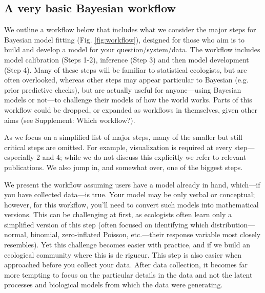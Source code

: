 \documentclass[11pt]{article}
\begin{document}
{\subsection*{A very basic Bayesian workflow}
We outline a workflow below that includes what we consider the major steps for Bayesian model fitting (Fig. \ref{fig:workflow}), designed for those who aim is to build and develop a model for
your question/system/data. The workflow includes model calibration (Steps 1-2), inference (Step 3) and then model development (Step 4). Many of these steps will be familiar to statistical ecologists, but are often overlooked, whereas other steps may appear particular to Bayesian (e.g. prior predictive checks), but are actually useful for anyone---using Bayesian models or not---to challenge their models of how the world works. Parts of this workflow could be dropped, or expanded as workflows in themselves, given other aims (see Supplement: Which workflow?). 

As we focus on a simplified list of major steps, many of the smaller but still critical steps are omitted. For example, visualization is required at every step---especially 2 and 4; while we do not discuss this explicitly we refer to relevant publications. We also jump in, and somewhat over, one of the biggest steps. 

We present the workflow assuming users have a model already in hand, which---if you have collected data---is true. Your model may be only verbal or conceptual; however, for this workflow, you’ll need to convert such models into mathematical versions. This can be challenging at first, as ecologists often learn only a simplified version of this step (often focused on identifying which distribution---normal, binomial, zero-inflated Poisson, etc.---their response variable most closely resembles). Yet this challenge becomes easier with practice, and if we build an ecological community where this is de rigueur. This step is also easier when approached before you collect your data. After data collection, it becomes far more tempting to focus on the particular details in the data and not the latent processes  and biological models from which the data were generating.

}
\end{document}
